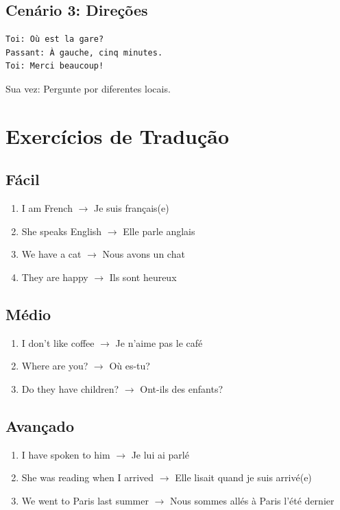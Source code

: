 \documentclass[a4paper,12pt]{article}
\begin{document}
\subsection{Cenário 3: Direções}
\begin{verbatim}
Toi: Où est la gare?
Passant: À gauche, cinq minutes.
Toi: Merci beaucoup!
\end{verbatim}
Sua vez: Pergunte por diferentes locais.

\section{Exercícios de Tradução}
\subsection{Fácil}
\begin{enumerate}
    \item I am French $\to$ Je suis français(e)
    \item She speaks English $\to$ Elle parle anglais
    \item We have a cat $\to$ Nous avons un chat
    \item They are happy $\to$ Ils sont heureux
\end{enumerate}
\subsection{Médio}
\begin{enumerate}
    \item I don't like coffee $\to$ Je n'aime pas le café
    \item Where are you? $\to$ Où es-tu?
    \item Do they have children? $\to$ Ont-ils des enfants?
\end{enumerate}
\subsection{Avançado}
\begin{enumerate}
    \item I have spoken to him $\to$ Je lui ai parlé
    \item She was reading when I arrived $\to$ Elle lisait quand je suis arrivé(e)
    \item We went to Paris last summer $\to$ Nous sommes allés à Paris l'été dernier
\end{enumerate}
\end{document}
